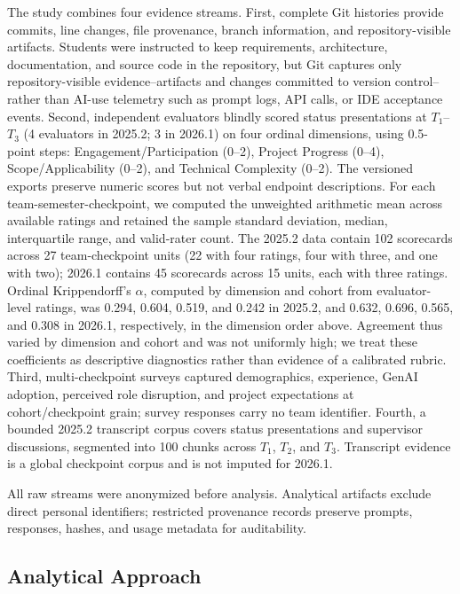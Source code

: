 The study combines four evidence streams. First, complete Git histories
provide commits, line changes, file provenance, branch information, and
repository-visible artifacts. Students were instructed to keep requirements,
architecture, documentation, and source code in the repository, but Git
captures only repository-visible evidence--artifacts and changes committed to
version control--rather than AI-use telemetry such as prompt logs, API calls,
or IDE acceptance events. Second, independent evaluators blindly scored
status presentations at $T_1$--$T_3$ (4 evaluators in 2025.2; 3 in 2026.1)
on four ordinal dimensions, using 0.5-point steps: Engagement/Participation
(0--2), Project Progress (0--4), Scope/Applicability (0--2), and Technical
Complexity (0--2). The versioned exports preserve numeric scores but not
verbal endpoint descriptions. For each team-semester-checkpoint, we computed
the unweighted arithmetic mean across available ratings and retained the
sample standard deviation, median, interquartile range, and valid-rater count.
The 2025.2 data contain 102 scorecards across 27 team-checkpoint units (22
with four ratings, four with three, and one with two); 2026.1 contains 45
scorecards across 15 units, each with three ratings. Ordinal Krippendorff's
$\alpha$, computed by dimension and cohort from evaluator-level ratings, was
0.294, 0.604, 0.519, and 0.242 in 2025.2, and 0.632, 0.696, 0.565, and
0.308 in 2026.1, respectively, in the dimension order above. Agreement thus
varied by dimension and cohort and was not uniformly high; we treat these
coefficients as descriptive diagnostics rather than evidence of a calibrated
rubric. Third, multi-checkpoint surveys captured demographics, experience,
GenAI adoption, perceived role disruption, and project expectations at
cohort/checkpoint grain; survey responses carry no team identifier. Fourth, a
bounded 2025.2 transcript corpus covers status presentations and supervisor
discussions, segmented into 100 chunks across $T_1$, $T_2$, and $T_3$.
Transcript evidence is a global checkpoint corpus and is not imputed for
2026.1.

All raw streams were anonymized before analysis. Analytical artifacts exclude
direct personal identifiers; restricted provenance records preserve prompts,
responses, hashes, and usage metadata for auditability.

\subsection{Analytical Approach}

